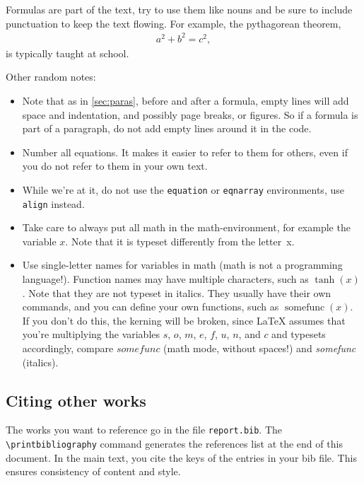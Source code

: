 \documentclass[runningheads,a4paper]{llncs}
\DeclareMathOperator*{\somefunc}{somefunc}
\begin{document}
Formulas are part of the text, try  to use them like nouns and be sure 
to include  punctuation to  keep the text  flowing.  For  example, the 
pythagorean theorem,                                                   
\begin{align}
    a^2 + b^2 = c^2,
\end{align}
is typically taught at school.

Other random notes:

\begin{itemize}
    \item
Note that  as in \cref{sec:paras},  before and after a  formula, empty 
lines will  add space  and indentation, and  possibly page  breaks, or 
figures.  So  if a formula  is part of a  paragraph, do not  add empty 
lines around it in the code.                                           

    \item
Number all equations.  It makes it  easier to refer to them for others,
even if you do not refer to them in your own text.

    \item
While we're at  it, do not use the  \verb+equation+ or \verb+eqnarray+ 
environments, use \verb+align+ instead.

    \item
Take care to always put all  math in the math-environment, for example 
the  variable $x$.   Note  that  it is  typeset  differently from  the 
letter~x.

    \item
Use  single-letter  names  for  variables   in  math  (math  is  not  a
programming language!).   Function names  may have  multiple characters,
such as $\tanh(x)$.  Note that they are not typeset in italics.  
They  usually have  their own  commands, and  you can  define your  own
functions, such as  $\somefunc(x)$.  If you don't do  this, the kerning
will  be broken,  since \LaTeX{}  assumes that  you're multiplying  the
variables  $s$, $o$,  $m$, $e$,  $f$, $u$,  $n$, and  $c$ and  typesets
accordingly,  compare  $somefunc$  (math  mode,  without  spaces!)  and
\emph{somefunc} (italics).

\end{itemize}

\subsection{Citing other works}

The  works you  want to  reference go  in the  file \verb+report.bib+. The 
\verb+\printbibliography+ command generates the references list at the end 
of this document.  In  the main text, you cite the keys  of the entries in 
your bib file. This ensures consistency of content and style.
\end{document}
